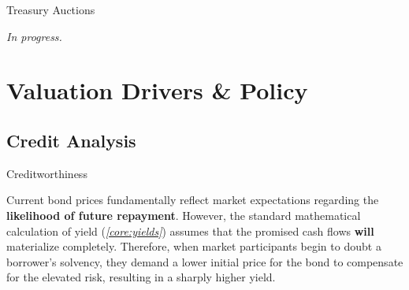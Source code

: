 \documentclass[10pt]{article}
\begin{document}
    \begin{core}{Treasury Auctions}

      \textit{In progress.}

    \end{core}

\section{Valuation Drivers \& Policy}

  \subsection{Credit Analysis}

    \begin{core}[label=core:creditworthiness]{Creditworthiness}

      Current bond prices fundamentally reflect market expectations regarding the \textbf{likelihood of future repayment}. However, the standard mathematical calculation of yield (\textit{\autoref{core:yields}}) assumes that the promised cash flows \textbf{will} materialize completely. Therefore, when market participants begin to doubt a borrower's solvency, they demand a lower initial price for the bond to compensate for the elevated risk, resulting in a sharply higher yield.

    \end{core} 
\end{document}
